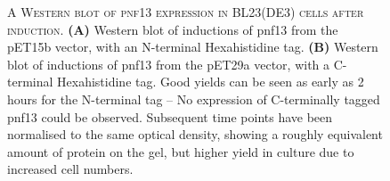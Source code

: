 \begin{figure}[p]
	\captionsetup{singlelinecheck=off, justification=justified, font=footnotesize, aboveskip=10pt}
	\caption[pnf13 expression trial Western blot]{\textsc{\normalsize A Western blot of pnf13 expression in BL23(DE3) cells after induction.} \newline
	\textbf{(A)} Western blot of inductions of pnf13 from the pET15b vector, with an N-terminal Hexahistidine tag. \textbf{(B)} Western blot of inductions of pnf13 from the pET29a vector, with a C-terminal Hexahistidine tag. Good yields can be seen as early as 2 hours for the N-terminal tag -- No expression of C-terminally tagged pnf13 could be observed. Subsequent time points have been normalised to the same optical density, showing a roughly equivalent amount of protein on the gel, but higher yield in culture due to increased cell numbers.}
	\label{pnf13expressiontrial}
\end{figure}

